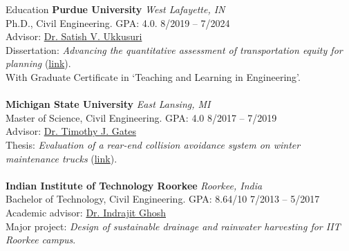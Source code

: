 \documentclass{CV} %
\begin{document}

\begin{rSection}{Education}
    {\bf Purdue University} \hfill {\em West Lafayette, IN}
    \\ Ph.D., Civil Engineering. GPA: 4.0. \hfill {8/2019 – 7/2024}
    \\ Advisor: \href{http://www.satishukkusuri.com/}{Dr. Satish V. Ukkusuri}
    \\ Dissertation: \emph{Advancing the quantitative assessment of transportation equity for planning} (\href{https://hammer.purdue.edu/articles/thesis/_b_Advancing_the_quantitative_assessment_of_transportation_equity_for_planning_b_/26321260}{link}). \\
    With Graduate Certificate in `Teaching and Learning in Engineering'. \\
    \\ {\bf Michigan State University} \hfill {\em East Lansing, MI} 
    \\ Master of Science, Civil Engineering. GPA: 4.0 \hfill {8/2017 – 7/2019}
    \\ Advisor: \href{https://www.egr.msu.edu/people/profile/gatestim}{Dr. Timothy J. Gates}
    \\ Thesis: \emph{Evaluation of a rear-end collision avoidance system on winter maintenance trucks} (\href{https://www.proquest.com/docview/2311960073?pq-origsite=gscholar&fromopenview=true&sourcetype=Dissertations%20&%20Theses}{link}). \\
    \\ {\bf Indian Institute of Technology Roorkee} \hfill {\em Roorkee, India}
    \\ Bachelor of Technology, Civil Engineering. GPA: 8.64/10 \hfill {7/2013 – 5/2017}
    \\ Academic advisor: \href{https://civil.iitr.ac.in/CE?Uid=indrafce}{Dr. Indrajit Ghosh}
    \\ Major project: \emph{Design of sustainable drainage and rainwater harvesting for IIT Roorkee campus}.
\end{rSection}
\end{document}
